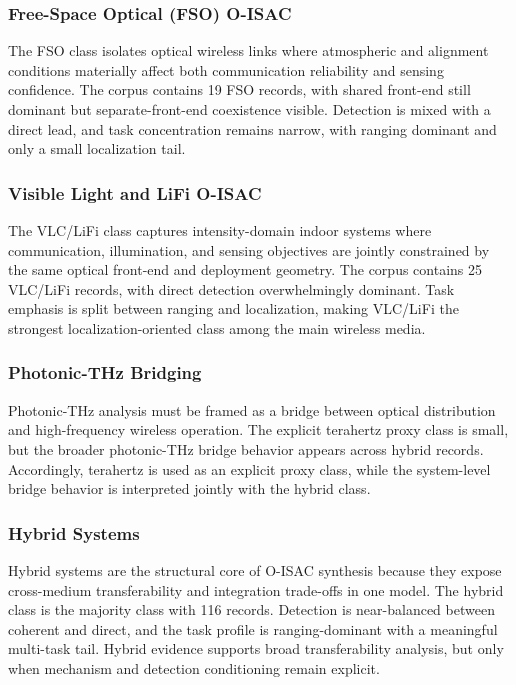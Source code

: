 \subsubsection{Free-Space Optical (FSO) O-ISAC}
The FSO class isolates optical wireless links where atmospheric and alignment conditions materially affect both communication reliability and sensing confidence. The corpus contains 19 FSO records, with shared front-end still dominant but separate-front-end coexistence visible. Detection is mixed with a direct lead, and task concentration remains narrow, with ranging dominant and only a small localization tail.

\subsubsection{Visible Light and LiFi O-ISAC}
The VLC/LiFi class captures intensity-domain indoor systems where communication, illumination, and sensing objectives are jointly constrained by the same optical front-end and deployment geometry. The corpus contains 25 VLC/LiFi records, with direct detection overwhelmingly dominant. Task emphasis is split between ranging and localization, making VLC/LiFi the strongest localization-oriented class among the main wireless media.

\subsubsection{Photonic-THz Bridging}
Photonic-THz analysis must be framed as a bridge between optical distribution and high-frequency wireless operation. The explicit terahertz proxy class is small, but the broader photonic-THz bridge behavior appears across hybrid records. Accordingly, terahertz is used as an explicit proxy class, while the system-level bridge behavior is interpreted jointly with the hybrid class.

\subsubsection{Hybrid Systems}
Hybrid systems are the structural core of O-ISAC synthesis because they expose cross-medium transferability and integration trade-offs in one model. The hybrid class is the majority class with 116 records. Detection is near-balanced between coherent and direct, and the task profile is ranging-dominant with a meaningful multi-task tail. Hybrid evidence supports broad transferability analysis, but only when mechanism and detection conditioning remain explicit.


